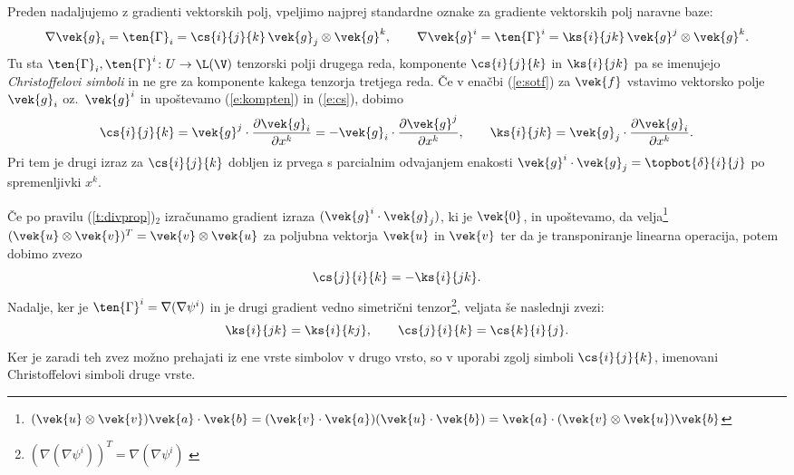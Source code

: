Preden nadaljujemo z gradienti vektorskih polj, vpeljimo najprej standardne oznake
za gradiente vektorskih polj naravne baze:
\begin{equation} \label{e:cs} %
	\nabla\vek{g}_i=\ten{\Gamma}_i=\cs{i}{j}{k}\,\vek{g}_j\otimes\vek{g}^k,\qquad
	\nabla\vek{g}^i=\ten{\Gamma}^i=\ks{i}{jk}\,\vek{g}^j\otimes\vek{g}^k.
\end{equation}
Tu sta $\ten{\Gamma}_i,\ten{\Gamma}^i\colon U\to\L(\V)$ tenzorski polji drugega reda,
komponente $\cs{i}{j}{k}$ in $\ks{i}{jk}$ pa se imenujejo \emph{Christoffelovi simboli}
in ne gre za komponente kakega tenzorja tretjega reda. Če v enačbi (\ref{e:sotf})
za $\vek{f}$ vstavimo vektorsko polje $\vek{g}_i$ oz.~$\vek{g}^i$ in upoštevamo
(\ref{e:kompten}) in (\ref{e:cs}), dobimo
\begin{equation} \label{e:csexplicit}
	\cs{i}{j}{k}=\vek{g}^j\cdot\frac{\partial\vek{g}_i}{\partial x^k}
	=-\vek{g}_i\cdot\frac{\partial\vek{g}^j}{\partial x^k},\qquad
	\ks{i}{jk}=\vek{g}_j\cdot\frac{\partial\vek{g}_i}{\partial x^k}.
\end{equation}
Pri tem je drugi izraz za $\cs{i}{j}{k}$ dobljen iz prvega s parcialnim odvajanjem
enakosti $\vek{g}^i\cdot\vek{g}_j=\topbot{\delta}{i}{j}$ po spremenljivki $x^k$.

Če po pravilu (\ref{t:divprop})$_2$ izračunamo gradient izraza $(\vek{g}^i\cdot\vek{g}_j)$,
ki je $\vek{0}$, in upoštevamo, da velja\footnote{
$(\vek{u}\otimes\vek{v})\vek{a}\cdot\vek{b}=(\vek{v}\cdot\vek{a})(\vek{u}\cdot\vek{b})=
\vek{a}\cdot(\vek{v}\otimes\vek{u})\vek{b}$}
$(\vek{u}\otimes\vek{v})^{T}=\vek{v}\otimes\vek{u}$
za poljubna vektorja $\vek{u}$ in $\vek{v}$ ter da je transponiranje linearna operacija,
potem dobimo zvezo
\begin{equation} \label{e:lcs1}
	\cs{j}{i}{k}=-\ks{i}{jk}.
\end{equation}
Nadalje, ker je $\ten{\Gamma}^i=\nabla(\nabla\psi^i)$ in je drugi gradient vedno
simetrični tenzor\footnote{$(\nabla(\nabla\psi^i))^T=\nabla(\nabla\psi^i)$ \cite[str.~271]{liu}},
veljata še naslednji zvezi:
\[ \ks{i}{jk}=\ks{i}{kj},\qquad\cs{j}{i}{k}=\cs{k}{i}{j}. \]
Ker je zaradi teh zvez možno prehajati iz ene vrste simbolov v drugo vrsto,
so v uporabi zgolj simboli $\cs{i}{j}{k}$, imenovani Christoffelovi simboli druge vrste.

